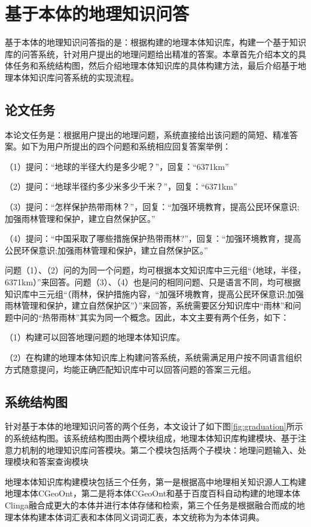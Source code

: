 \chapter{基于本体的地理知识问答}\label{chapter:al_sup}
基于本体的地理知识问答指的是：根据构建的地理本体知识库，构建一个基于知识库的问答系统，针对用户提出的地理问题给出精准的答案。本章首先介绍本文的具体任务和系统结构图，然后介绍地理本体知识库的具体构建方法，最后介绍基于地理本体知识库问答系统的实现流程。

\section{论文任务}
本论文任务是：根据用户提出的地理问题，系统直接给出该问题的简短、精准答案。如下为用户所提出的四个问题和系统相应回复答案举例：

（1）提问：“地球的半径大约是多少呢？”，回复：“6371km”

（2）提问：“地球半径约多少米多少千米？”，回复：“6371km”

（3）提问：“怎样保护热带雨林？”，回复：“加强环境教育，提高公民环保意识;加强雨林管理和保护，建立自然保护区。”

（4）提问：“中国采取了哪些措施保护热带雨林?”，回复：“加强环境教育，提高公民环保意识;加强雨林管理和保护，建立自然保护区。”

问题（1）、（2）问的为同一个问题，均可根据本文知识库中三元组“（地球，半径，6371km）”来回答。问题（3）、（4）也是问的相同问题、只是语言不同，均可根据知识库中三元组“（雨林，保护措施内容，“加强环境教育，提高公民环保意识;加强雨林管理和保护，建立自然保护区”）”来回答，系统需要区分知识库中“雨林”和问题中问的“热带雨林”其实为同一个概念。因此，本文主要有两个任务，如下：

（1）构建可以回答地理问题的地理本体知识库。

（2）在构建的地理本体知识库上构建问答系统，系统需满足用户按不同语言组织方式随意提问，均能正确匹配知识库中可以回答问题的答案三元组。

\section{系统结构图}
针对基于本体的地理知识问答的两个任务，本文设计了如下图\ref{fig:graduation}所示的系统结构图。该系统结构图由两个模块组成，地理本体知识库构建模块、基于注意力机制的地理知识库问答模块。第二个模块包括两个子模块：地理问题输入、处理模块和答案查询模块

地理本体知识库构建模块包括三个任务，第一是根据高中地理相关知识源人工构建地理本体CGeoOnt，第二是将本体CGeoOnt和基于百度百科自动构建的地理本体Clinga融合成更大的本体并进行本体存储和检索，第三个任务是根据融合而成的地理本体构建本体词汇表和本体同义词词汇表，本文统称为为本体词典。

